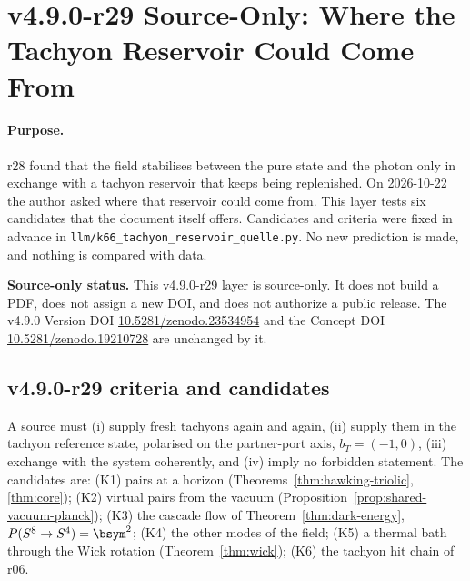 \clearpage
\section*{v4.9.0-r29 Source-Only: Where the Tachyon Reservoir Could Come From}
\label{sec:v490-r29-reservoir-source}

\paragraph{Purpose.}
r28 found that the field stabilises between the pure state and the photon only in exchange with a tachyon reservoir that keeps
being replenished.  On 2026-10-22 the author asked where that reservoir could come from.  This layer tests six candidates that the
document itself offers.  Candidates and criteria were fixed in advance in \texttt{llm/k66\_tachyon\_reservoir\_quelle.py}.  No new
prediction is made, and nothing is compared with data.

\noindent\textbf{Source-only status.}
This v4.9.0-r29 layer is source-only.  It does not build a PDF, does not assign a new DOI,
and does not authorize a public release.  The v4.9.0 Version DOI
\href{https://doi.org/10.5281/zenodo.23534954}{10.5281/zenodo.23534954} and the Concept DOI
\href{https://doi.org/10.5281/zenodo.19210728}{10.5281/zenodo.19210728} are unchanged by it.

\subsection*{v4.9.0-r29 criteria and candidates}
\label{subsec:v490-r29-criteria}

A source must (i) supply fresh tachyons again and again, (ii) supply them in the tachyon reference state, polarised on the
partner-port axis, \(b_T=(-1,0)\), (iii) exchange with the system coherently, and (iv) imply no forbidden statement.  The candidates
are: (K1) pairs at a horizon (Theorems~\ref{thm:hawking-triolic}, \ref{thm:core}); (K2) virtual pairs from the vacuum
(Proposition~\ref{prop:shared-vacuum-planck}); (K3) the cascade flow of Theorem~\ref{thm:dark-energy}, \(P(S^8\to S^4)=\bsym^2\);
(K4) the other modes of the field; (K5) a thermal bath through the Wick rotation (Theorem~\ref{thm:wick}); (K6) the tachyon hit
chain of r06.

